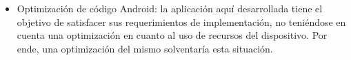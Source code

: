 \begin{itemize}
    \item Optimización de código Android: la aplicación aquí desarrollada tiene el objetivo de satisfacer sus requerimientos de implementación, no teniéndose en cuenta una optimización en cuanto al uso de recursos del dispositivo. Por ende, una optimización del mismo solventaría esta situación.
    
    
\end{itemize}

\clearpage






